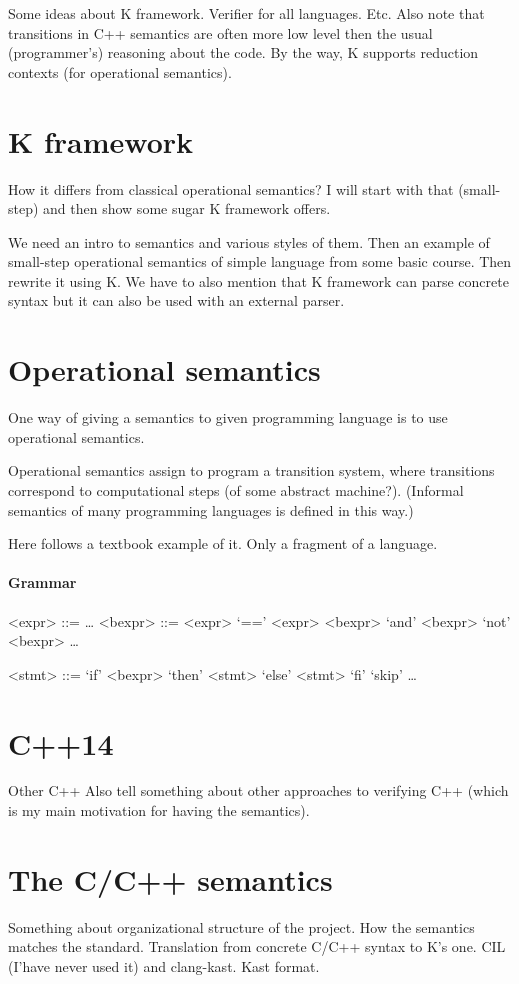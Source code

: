 \documentclass{fithesis3}
\begin{document}
Some ideas about K framework. Verifier for all languages. Etc. Also note that transitions in C++ semantics are often more low level then the usual (programmer's) reasoning about the code. By the way, K supports reduction contexts (for operational semantics).

\section{K framework}
How it differs from classical operational semantics? I will start with that (small-step) and then show some sugar K framework offers.

We need an intro to semantics and various styles of them. Then an example of small-step operational semantics of simple language from some basic course. Then rewrite it using K. We have to also mention that K framework can parse concrete syntax but it can also be used with an external parser.


\section{Operational semantics}
One way of giving a semantics to given programming language is to use operational semantics. 

Operational semantics assign to program a transition system, where transitions correspond to computational steps (of some abstract machine?). (Informal semantics of many programming languages is defined in this way.)

Here follows a textbook example of it. Only a fragment of a language.


\paragraph{Grammar}
\setlength{\grammarparsep}{20pt plus 1pt minus 1pt} %

\begin{grammar}

<expr> ::= \ldots
<bexpr> ::= <expr> `==' <expr> 
\alt <bexpr> `and' <bexpr>
\alt `not' <bexpr>
\alt \ldots

<stmt> ::= `if' <bexpr> `then' <stmt> `else' <stmt> `fi'
\alt `skip'
\alt \ldots

\end{grammar}


\section{C++14}
Other C++ Also tell something about other approaches to verifying C++ (which is my main motivation for having the semantics).

\section{The C/C++ semantics}
Something about organizational structure of the project. How the semantics matches the standard. Translation from concrete C/C++ syntax to K's one. CIL (I'have never used it) and clang-kast. Kast format.
\end{document}
